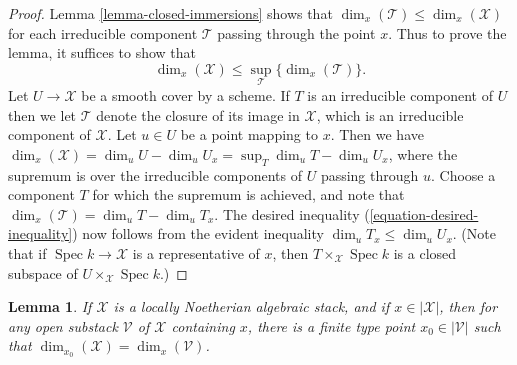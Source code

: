 \documentclass{stacks-project}
\theoremstyle{plain}
\newtheorem{lemma}[subsection]{Lemma}
\theoremstyle{definition}
\theoremstyle{remark}
\numberwithin{equation}{subsection}
\def\Spec{\mathop{\mathrm{Spec}}}
\begin{document}
\begin{proof}
Lemma \ref{lemma-closed-immersions}
shows that
$\dim_x (\mathcal{T}) \leq \dim_x(\mathcal{X})$ for each
irreducible component $\mathcal{T}$ passing through
the point $x$.   Thus to prove the lemma,
it suffices to show that
\begin{equation}
\label{equation-desired-inequality}
\dim_x(\mathcal{X}) \leq
\sup_{\mathcal{T}} \{\dim_x(\mathcal{T})\}.
\end{equation}
Let $U\to\mathcal{X}$ be a smooth cover by a scheme. If $T$ is an irreducible
component of $U$ then we let $\mathcal{T}$ denote the closure of its image
in $\mathcal{X}$, which is an irreducible component of $\mathcal{X}$. Let
$u \in U$ be
a point mapping to $x$. Then we have
$\dim_x(\mathcal{X})=\dim_uU-\dim_uU_x=\sup_T\dim_uT-\dim_uU_x$, where the
supremum is over the irreducible components of $U$ passing
through $u$. Choose a component $T$ for which the supremum
is achieved, and note that
$\dim_x(\mathcal{T})=\dim_uT-\dim_u T_x$.
The desired inequality (\ref{equation-desired-inequality})
now follows from the evident inequality $\dim_u T_x \leq \dim_u U_x.$
(Note that if $\Spec k \to \mathcal{X}$ is a representative of $x$,
then $T\times_{\mathcal{X}} \Spec k$ is a closed subspace of
$U\times_{\mathcal{X}}
\Spec k$.)
\end{proof}

\begin{lemma}
\label{lemma-dimension-at-finite-type-point}
If $\mathcal{X}$ is a locally Noetherian algebraic stack, and if
$x \in |\mathcal{X}|$, then
for any open substack $\mathcal{V}$ of $\mathcal{X}$ containing $x$,
there is a finite type point $x_0 \in |\mathcal{V}|$ such that
$\dim_{x_0}(\mathcal{X}) = \dim_x(\mathcal{V})$.
\end{lemma}
\end{document}

